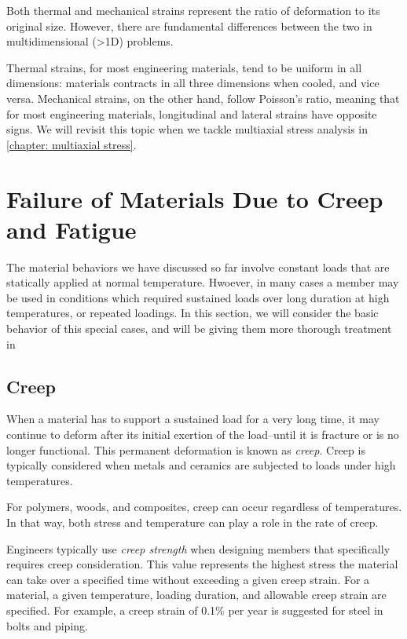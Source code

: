 \documentclass[
10pt,
a4paper,
openany,
svgnames,
]{kaobook} %
\begin{document}
Both thermal and mechanical strains represent the ratio of deformation to its original size. However, there are fundamental differences between the two in multidimensional (>1D) problems.

Thermal strains, for most engineering materials, tend to be uniform in all dimensions: materials contracts in all three dimensions when cooled, and vice versa. Mechanical strains, on the other hand, follow Poisson's ratio, meaning that for most engineering materials, longitudinal and lateral strains have opposite signs. We will revisit this topic when we tackle multiaxial stress analysis in \cref{chapter: multiaxial stress}.

\section{Failure of Materials Due to Creep and Fatigue}

The material behaviors we have discussed so far involve constant loads that are statically applied at normal temperature. Hwoever, in many cases a member may be used in conditions which required sustained loads over long duration at high temperatures, or repeated loadings. In this section, we will consider the basic behavior of this special cases, and will be giving them more thorough treatment in 

\subsection{Creep}

When a material has to support a sustained load for a very long time, it may continue to deform after its initial exertion of the load--until it is fracture or is no longer functional. This permanent deformation is known as \emph{creep}. Creep is typically considered when metals and ceramics are subjected to loads under high temperatures.

For polymers, woods, and composites, creep can occur regardless of temperatures. In that way, both stress and temperature can play a role in the rate of creep.

Engineers typically use \emph{creep strength} when designing members that specifically requires creep consideration. This value represents the highest stress the material can take over a specified time without exceeding a given creep strain. For a material, a given temperature, loading duration, and allowable creep strain are specified. For example, a creep strain of 0.1\% per year is suggested for steel in bolts and piping. \cite{hibbeler2013}
\end{document}
